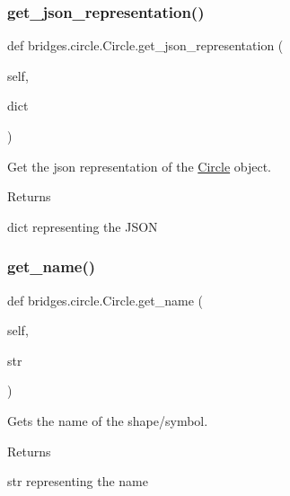 \subsubsection{\texorpdfstring{get\+\_\+json\+\_\+representation()}{get\_json\_representation()}}
{\footnotesize\ttfamily def bridges.\+circle.\+Circle.\+get\+\_\+json\+\_\+representation (\begin{DoxyParamCaption}\item[{}]{self,  }\item[{}]{dict }\end{DoxyParamCaption})}



Get the json representation of the \hyperlink{classbridges_1_1circle_1_1_circle}{Circle} object. 

\begin{DoxyReturn}{Returns}


dict representing the J\+S\+ON 
\end{DoxyReturn}
\mbox{\label{classbridges_1_1circle_1_1_circle_acacc4d8cc5f2db86cfcba61f31652003}} 
\subsubsection{\texorpdfstring{get\+\_\+name()}{get\_name()}}
{\footnotesize\ttfamily def bridges.\+circle.\+Circle.\+get\+\_\+name (\begin{DoxyParamCaption}\item[{}]{self,  }\item[{}]{str }\end{DoxyParamCaption})}



Gets the name of the shape/symbol. 

\begin{DoxyReturn}{Returns}


str representing the name 
\end{DoxyReturn}
\mbox{\label{classbridges_1_1circle_1_1_circle_abc82c7f3e8ac6112167b396839863319}} 
